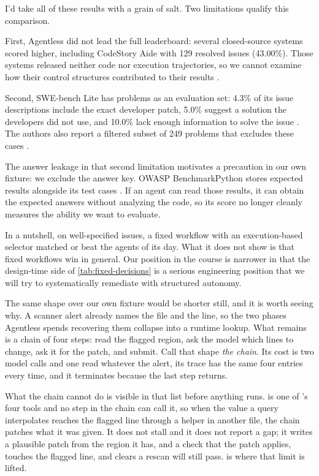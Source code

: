 I'd take all of these results with a grain of salt. Two limitations qualify this comparison. 

\bi
  \item First, Agentless did not lead the full leaderboard:
several closed-source systems scored higher, including CodeStory Aide with 129 resolved issues
(43.00\%). Those systems released neither code nor execution trajectories, so we cannot examine
how their control structures contributed to their results \citep[Table~1]{xia2025agentless}.
  \item Second, SWE-bench Lite has problems as an evaluation set: 4.3\% of its issue descriptions include
the exact developer patch, 5.0\% suggest a solution the developers did not use, and 10.0\% lack
enough information to solve the issue \citep[\S6.1]{xia2025agentless}. The authors also report a
filtered subset of 249 problems that excludes these cases \citep[\S6.2]{xia2025agentless}.
\ei

The answer leakage in that second limitation motivates a precaution in our own fixture: we
exclude the answer key. OWASP BenchmarkPython stores expected results alongside its test cases
\citep{owasp-benchmarkpython}. If an agent can read those results, it can obtain the expected
answers without analyzing the code, so its score no longer cleanly measures the ability we want
to evaluate.

In a nutshell, on well-specified issues, a fixed workflow with an execution-based selector matched or
beat the agents of its day. What it does not show is that fixed workflows win in general. 
Our position in the course is narrower in that the design-time side of \cref{tab:fixed-decisions} 
is a serious engineering position that we will try to systematically remediate with structured autonomy.

The same shape over our own fixture would be shorter still, and it is worth seeing why. A scanner
alert already names the file and the line, so the two phases Agentless spends recovering them
collapse into a runtime lookup. What remains is a chain of four steps: read the flagged region, ask
the model which lines to change, ask it for the patch, and submit. Call that shape \emph{the
chain}. Its cost is two model calls and one read whatever the alert, its trace has the same four
entries every time, and it terminates because the last step returns.

What the chain cannot do is visible in that list before anything runs.  is one of
\msa{}'s four tools and no step in the chain can call it, so when the value a query interpolates
reaches the flagged line through a helper in another file, the chain patches what it was given. It
does not stall and it does not report a gap; it writes a plausible patch from the region it has,
and a check that the patch applies, touches the flagged line, and clears a rescan will still pass.
 is where that limit is lifted.


